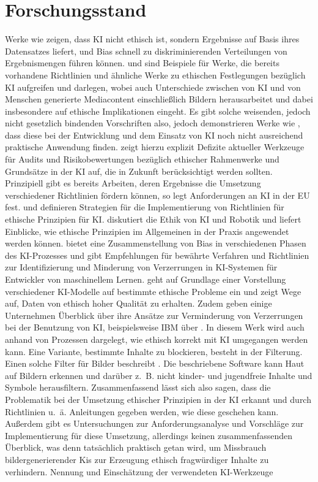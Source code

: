 \section{Forschungsstand}
Werke wie \cite{Salminen} zeigen, dass KI nicht ethisch ist, sondern Ergebnisse auf Basis ihres Datensatzes liefert,
und Bias schnell zu diskriminierenden Verteilungen von Ergebnismengen führen können. \cite{Jobin} und \cite{Partadiredja}
sind Beispiele für Werke, die bereits vorhandene Richtlinien und ähnliche Werke zu ethischen Festlegungen bezüglich KI 
aufgreifen und darlegen, wobei \cite{Partadiredja} auch Unterschiede zwischen von KI und von Menschen generierte 
Mediacontent einschließlich Bildern herausarbeitet und dabei insbesondere auf ethische Implikationen eingeht. 
Es gibt solche weisenden, jedoch nicht gesetzlich bindenden Vorschriften also, jedoch demonstrieren Werke wie 
\cite{Ayling}, dass diese bei der Entwicklung und dem Einsatz von KI noch nicht ausreichend praktische Anwendung 
finden. \cite{Ayling} zeigt hierzu explizit Defizite aktueller Werkzeuge für Audits und Risikobewertungen bezüglich 
ethischer Rahmenwerke und Grundsätze in der KI auf, die in Zukunft berücksichtigt werden sollten. 
Prinzipiell gibt es bereits Arbeiten, deren Ergebnisse die Umsetzung verschiedener Richtlinien fördern können, so legt 
\cite{EUCommision} Anforderungen an KI in der EU fest. \cite{Jobin} und \cite{Hagendorff} definieren Strategien 
für die Implementierung von Richtlinien für ethische Prinzipien für KI. \cite{Stahl} diskutiert die Ethik von KI und Robotik 
und liefert Einblicke, wie ethische Prinzipien im Allgemeinen in der Praxis angewendet werden können. \cite{Srinivasan} bietet 
eine Zusammenstellung von Bias in verschiedenen Phasen des KI-Prozesses und gibt Empfehlungen für bewährte Verfahren und 
Richtlinien zur Identifizierung und Minderung von Verzerrungen in KI-Systemen für Entwickler von maschinellem Lernen. \cite{Jameel} 
geht auf Grundlage einer Vorstellung verschiedener KI-Modelle auf bestimmte ethische Probleme ein und zeigt Wege auf, 
Daten von ethisch hoher Qualität zu erhalten.
Zudem geben einige Unternehmen Überblick über ihre Ansätze zur Verminderung von Verzerrungen bei der Benutzung von KI, 
beispielsweise IBM über \cite{Hobson}. In diesem Werk wird auch anhand von Prozessen dargelegt, wie ethisch korrekt mit KI 
umgegangen werden kann.
Eine Variante, bestimmte Inhalte zu blockieren, besteht in der Filterung. Einen solche Filter für Bilder beschreibt \cite{Zheng}.
Die beschriebene Software kann Haut auf Bildern erkennen und darüber z. B. nicht kinder- und jugendfreie Inhalte und Symbole herausfiltern.
Zusammenfassend lässt sich also sagen, dass die Problematik bei der Umsetzung ethischer Prinzipien in der KI erkannt und
durch Richtlinien u. ä. Anleitungen gegeben werden, wie diese geschehen kann. Außerdem gibt es Untersuchungen 
zur Anforderungsanalyse und Vorschläge zur Implementierung für diese Umsetzung, allerdings keinen zusammenfassenden 
Überblick, was denn tatsächlich praktisch getan wird, um Missbrauch bildergenerierender Kis zur Erzeugung ethisch 
fragwürdiger Inhalte zu verhindern.
Nennung und Einschätzung der verwendeten KI-Werkzeuge

